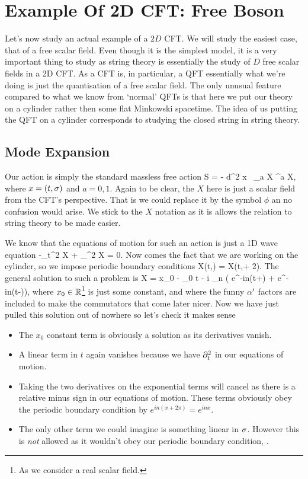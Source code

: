 \chapter{Example Of 2D CFT: Free Boson}

Let's now study an actual example of a $2D$ CFT. We will study the easiest case, that of a free scalar field. Even though it is the simplest model, it is a very important thing to study as string theory is essentially the study of $D$ free scalar fields in a 2D CFT. As a CFT is, in particular, a QFT essentially what we're doing is just the quantisation of a free scalar field. The only unusual feature compared to what we know from `normal' QFTs is that here we put our theory on a cylinder rather then some flat Minkowski spacetime. The idea of us putting the QFT on a cylinder corresponds to studying the closed string in string theory. 

\section{Mode Expansion}

Our action is simply the standard massless free action
\bse 
    S = - \int d^2 x \, \p_a X \p^a X,
\ese
where $x=(t,\sigma)$ and $a=0,1$. Again to be clear, the $X$ here is just a scalar field from the CFT's perspective. That is we could replace it by the symbol $\phi$ an no confusion would arise. We stick to the $X$ notation as it is allows the relation to string theory to be made easier. 

We know that the equations of motion for such an action is just a 1D wave equation
\bse 
    -\p_t^2 X + \p_{\sig}^2 X = 0.
\ese 
Now comes the fact that we are working on the cylinder, so we impose periodic boundary conditions
\be 
\label{eqn:XPeriodicBoundaryConditions}
    X(t,\sig) = X(t,\sig + 2\pi).
\ee 
The general solution to such a problem is
\be 
\label{eqn:XGeneralSolution}
    X = x_0 - \sqrt{2\a^{\prime}} \a_0 t - i  \sum_{n} \bigg(  e^{-in(t+\sig)} +  e^{-in(t-\sig)}\bigg),
\ee 
where $x_0\in \mathbb{R}$\footnote{As we consider a real scalar field.} is just some constant, and where the funny $\alpha^{\prime}$ factors are included to make the commutators that come later nicer. Now we have just pulled this solution out of nowhere so let's check it makes sense 
\begin{itemize}
    \item The $x_0$ constant term is obviously a solution as its derivatives vanish. 
    \item A linear term in $t$ again vanishes because we have $\partial_t^2$ in our equations of motion. 
    \item Taking the two derivatives on the exponential terms will cancel as there is a relative minus sign in our equations of motion. These terms obviously obey the periodic boundary condition by $e^{in(x+2\pi)} = e^{inx}$.
    \item The only other term we could imagine is something linear in $\sigma$. However this is \textit{not} allowed as it wouldn't obey our periodic boundary condition, .
\end{itemize}

